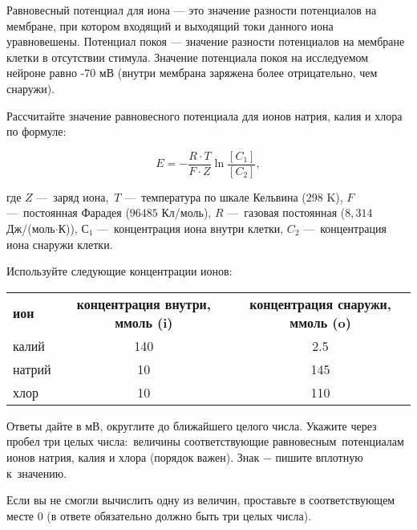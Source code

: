
Равновесный потенциал для иона — это значение разности потенциалов на мембране, при котором входящий и выходящий токи данного иона уравновешены. Потенциал покоя — значение разности потенциалов на мембране клетки в отсутствии стимула. Значение потенциала покоя на исследуемом нейроне равно -70 мВ (внутри мембрана заряжена более отрицательно, чем снаружи).

Рассчитайте значение равновесного потенциала для ионов натрия, калия и хлора по формуле:

$$E = -\dfrac{R\cdot T}{F\cdot Z}\ln \dfrac{[C_1]}{[C_2]},$$

где $Z$ — заряд иона, $T$ — температура по шкале Кельвина ($298$ K), $F$ — постоянная Фарадея ($96485$ Кл/моль), $R$ — газовая постоянная ($8,314$ Дж/(моль$\cdot$К)), $С_1$ — концентрация иона внутри клетки, $C_2$ — концентрация иона снаружи клетки.

Используйте следующие концентрации ионов:

\begin{tabular}{|l|c|c|}
    \bf ион & \bf концентрация внутри, ммоль (i) & \bf концентрация снаружи, ммоль (o) \\
    калий & 140 & 2.5 \\
    натрий & 10 & 145 \\
    хлор & 10 & 110 \\
\end{tabular}

Ответы дайте в мВ, округлите до ближайшего целого числа. Укажите через пробел три целых числа: величины соответствующие равновесным потенциалам ионов натрия, калия и хлора (порядок важен). Знак $-$ пишите вплотную к значению.

Если вы не смогли вычислить одну из величин, проставьте в соответствующем месте 0 (в ответе обязательно должно быть три целых числа). 


